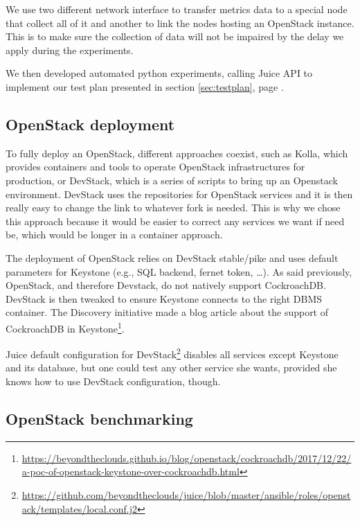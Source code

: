 We use two different network interface to transfer metrics data to a special node that collect all of it and another to link the nodes hosting an OpenStack instance. This is to make sure the collection of data will not be impaired by the delay we apply during the experiments.

We then developed automated python experiments, calling Juice API to implement our test plan presented in section \ref{sec:testplan}, page \pageref{sec:testplan}.

\subsection{OpenStack deployment}

To fully deploy an OpenStack, different approaches coexist, such as Kolla, which provides containers and tools to operate OpenStack infrastructures for production, or DevStack, which is a series of scripts to bring up an Openstack environment. DevStack uses the repositories for OpenStack services and it is then really easy to change the link to whatever fork is needed. This is why we chose this approach because it would be easier to correct any services we want if need be, which would be longer in a container approach.

The deployment of OpenStack relies on DevStack stable/pike and uses default parameters for Keystone (e.g., SQL backend, fernet token, \dots). As said previously, OpenStack, and therefore Devstack, do not natively support CockroachDB. DevStack is then tweaked to ensure Keystone connects to the right DBMS container. The Discovery initiative made a blog article about the support of CockroachDB in Keystone\footnote{\url{https://beyondtheclouds.github.io/blog/openstack/cockroachdb/2017/12/22/a-poc-of-openstack-keystone-over-cockroachdb.html}}.

Juice default configuration for DevStack\footnote{\url{https://github.com/beyondtheclouds/juice/blob/master/ansible/roles/openstack/templates/local.conf.j2}} disables all services except Keystone and its database, but one could test any other service she wants, provided she knows how to use DevStack configuration, though.


\subsection{OpenStack benchmarking}
\label{subsec:benchmarking}

